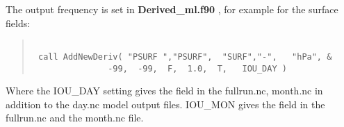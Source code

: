 The output frequency is set in { \bf Derived\_ml.f90 }, for example for the surface fields:
\begin{quote}
\begin{verbatim}

 call AddNewDeriv( "PSURF ","PSURF",  "SURF","-",   "hPa", &
               -99,  -99,  F,  1.0,  T,   IOU_DAY )

\end{verbatim}
\end{quote}
 Where the IOU\_DAY setting gives the field in the fullrun.nc, month.nc in addition to the day.nc 
model output files. IOU\_MON gives the field in the fullrun.nc and the month.nc file. 




